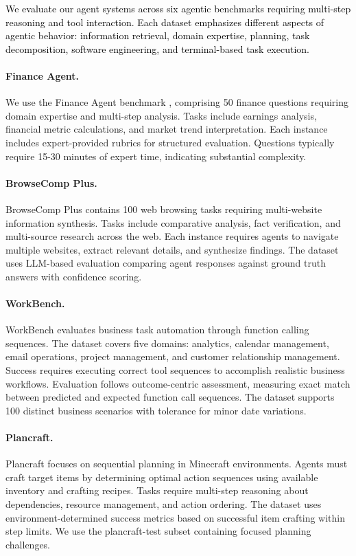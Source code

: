 \textcolor{black}{We evaluate our agent systems across six agentic benchmarks requiring multi-step reasoning and tool interaction. Each dataset emphasizes different aspects of agentic behavior: information retrieval, domain expertise, planning, task decomposition, software engineering, and terminal-based task execution.}

\paragraph{Finance Agent.}

We use the Finance Agent benchmark \citep{bigeard2025finance}, comprising 50 finance questions requiring domain expertise and multi-step analysis. Tasks include earnings analysis, financial metric calculations, and market trend interpretation. Each instance includes expert-provided rubrics for structured evaluation. Questions typically require 15-30 minutes of expert time, indicating substantial complexity. 

\paragraph{BrowseComp Plus.}
BrowseComp Plus \citep{chen2025browsecomp} contains 100 web browsing tasks requiring multi-website information synthesis. Tasks include comparative analysis, fact verification, and
multi-source research across the web. Each instance requires agents to navigate multiple websites, extract relevant details, and synthesize findings. The dataset uses LLM-based evaluation comparing agent responses against ground truth answers with confidence scoring.

\paragraph{WorkBench.}
WorkBench \citep{styles2024workbench} evaluates business task automation through function calling sequences. The dataset covers five domains: analytics, calendar management, email
operations, project management, and customer relationship management. Success requires executing correct tool sequences to accomplish realistic business workflows. Evaluation follows outcome-centric assessment, measuring exact match between predicted and expected function call sequences. The dataset supports 100 distinct business scenarios with tolerance for minor date variations.

\paragraph{Plancraft.}
Plancraft \citep{dagan2024plancraft} focuses on sequential planning in Minecraft environments. Agents must craft target items by determining optimal action sequences using available inventory and crafting recipes. Tasks require multi-step reasoning about dependencies, resource management, and action ordering. The dataset uses environment-determined success
metrics based on successful item crafting within step limits. We use the plancraft-test subset containing focused planning challenges.

